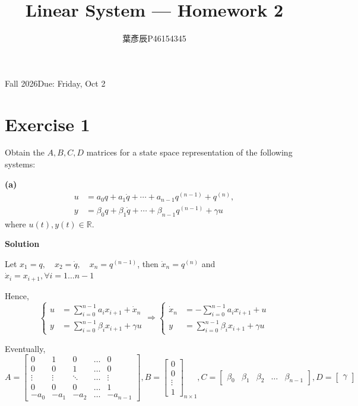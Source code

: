 \documentclass[12pt,a4paper]{article}
\title{Linear System --- Homework 2}
\author{葉彥辰\quad P46154345}
\date{}
\begin{document}
\maketitle
\begin{center}Fall 2026\quad Due: Friday, Oct 2\end{center}

\section*{Exercise 1}
Obtain the $A,B,C,D$ matrices for a state space representation of the following systems:

\textbf{(a)}
\[
\begin{aligned}
u &= a_0q+a_1\dot q+\cdots+a_{n-1}q^{(n-1)}+q^{(n)},\\
y &= \beta_0q+\beta_1\dot q+\cdots+\beta_{n-1}q^{(n-1)}+\gamma u
\end{aligned}
\]
where $u(t),y(t)\in\mathbb{R}$.

\textbf{Solution}

Let $ x_1 = q,\quad x_2 = \dot q,\quad x_n = q^{(n - 1)} $, then $ \dot x_n = q^{(n)} $ and $\dot x_i = x_{i + 1}, \forall i = 1 \dots n - 1$

Hence, 
\[
\begin{cases}
u &= \displaystyle\sum_{i = 0}^{n - 1} a_ix_{i + 1} + \dot x_n  \\
y &= \displaystyle\sum_{i = 0}^{n - 1} \beta_i x_{i + 1} + \gamma u
\end{cases} \Rightarrow \begin{cases}
\dot x_n &= - \displaystyle\sum_{i = 0}^{n - 1} a_ix_{i + 1} + u \\
y &= \displaystyle\sum_{i = 0}^{n - 1} \beta_i x_{i + 1} + \gamma u
\end{cases}
\]

Eventually, 
\[
A = \begin{bmatrix}
	0 & 1 &   0 &\dots & 0 \\
	0 & 0 &   1 & \dots &0 \\
	\vdots & \vdots & \ddots & \dots&\vdots \\
	0 & 0 & 0 &  \dots  & 1 \\
	-a_0 & -a_1 & -a_2 & \dots & -a_{n - 1}
\end{bmatrix}, B = \begin{bmatrix}
0 \\ 0 \\ \vdots \\ 1
\end{bmatrix}_{n \times 1}, C = \begin{bmatrix}
\beta_0 & \beta_1 & \beta_2 & \dots & \beta_{n - 1}
\end{bmatrix}, D = \begin{bmatrix}
\gamma
\end{bmatrix}
\]
\end{document}
